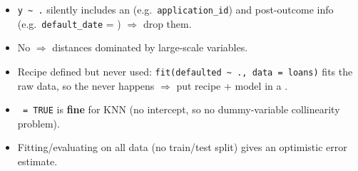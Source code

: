 \begin{trap}
\begin{itemize}
\item \texttt{y \textasciitilde{} .} silently includes an  (e.g.\ \texttt{application\_id}) and post-outcome info (e.g.\ \texttt{default\_date} = ) $\Rightarrow$ drop them.
\item No  $\Rightarrow$ distances dominated by large-scale variables.
\item Recipe defined but never used: \texttt{fit(defaulted \textasciitilde{} ., data = loans)} fits the raw data, so the  never happens $\Rightarrow$ put recipe + model in a .
\item {}\texttt{ = TRUE} is \textbf{fine} for KNN (no intercept, so no dummy-variable collinearity problem).
\item Fitting/evaluating on all data (no train/test split) gives an optimistic error estimate.
\end{itemize}
\end{trap}
